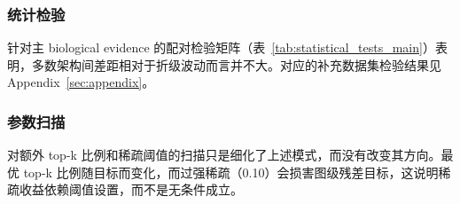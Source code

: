 \subsubsection{统计检验}



针对主 biological evidence 的配对检验矩阵（表~\ref{tab:statistical_tests_main}）表明，多数架构间差距相对于折级波动而言并不大。对应的补充数据集检验结果见 Appendix~\ref{sec:appendix}。

\subsubsection{参数扫描}

对额外 top-k 比例和稀疏阈值的扫描只是细化了上述模式，而没有改变其方向。最优 top-k 比例随目标而变化，而过强稀疏（0.10）会损害图级残差目标，这说明稀疏收益依赖阈值设置，而不是无条件成立。
